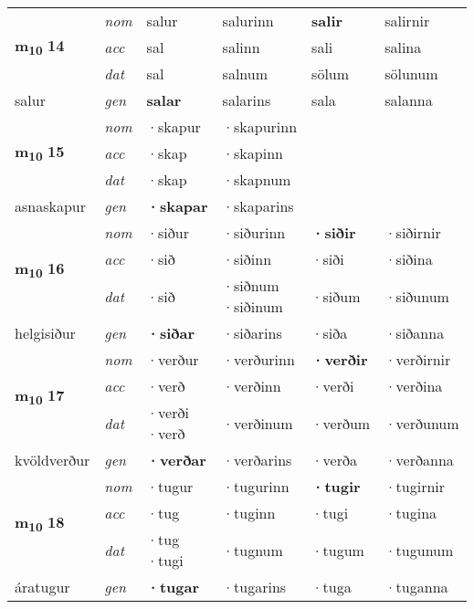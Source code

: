 \begin{longtable}[l]{X>{\footnotesize\itshape}XXXXX}
\multirow{3}{*}{{{\textbf{m{\textsubscript{10}}} \Large{\textbf{14}}}}}  
 & nom & salur & salurinn    & \textbf{salir} & salirnir  \\*
 & acc & sal  & salinn   & sali  & salina \\*
 & dat & sal & salnum   & sölum & sölunum \\*
 {\footnotesize{salur}} &  gen & \textbf{salar}  & salarins  & sala & salanna \\
\cmidrule{1-6}


\multirow{3}{*}{{{\textbf{m{\textsubscript{10}}} \Large{\textbf{15}}}}}  
 & nom & ·skapur & ·skapurinn    & \textbf{} &   \\*
 & acc & ·skap  & ·skapinn   &   &  \\*
 & dat & ·skap & ·skapnum   &  &  \\*
 {\footnotesize{asnaskapur}} &  gen & \textbf{·skapar}  & ·skaparins  &  &  \\
\cmidrule{1-6}


\multirow{3}{*}{{{\textbf{m{\textsubscript{10}}} \Large{\textbf{16}}}}}  
 & nom & ·siður & ·siðurinn    & \textbf{·siðir} & ·siðirnir  \\*
 & acc & ·sið  & ·siðinn   & ·siði  & ·siðina \\*
 & dat & ·sið & \specialcell{·siðnum\\  ·siðinum}   & ·siðum & ·siðunum \\*
 {\footnotesize{helgisiður}} &  gen & \textbf{·siðar}  & ·siðarins  & ·siða & ·siðanna \\
\cmidrule{1-6}


\multirow{3}{*}{{{\textbf{m{\textsubscript{10}}} \Large{\textbf{17}}}}}  
 & nom & ·verður & ·verðurinn    & \textbf{·verðir} & ·verðirnir  \\*
 & acc & ·verð  & ·verðinn   & ·verði  & ·verðina \\*
 & dat & \specialcell{·verði\\  ·verð} & ·verðinum   & ·verðum & ·verðunum \\*
 {\footnotesize{kvöldverður}} &  gen & \textbf{·verðar}  & ·verðarins  & ·verða & ·verðanna \\
\cmidrule{1-6}


\multirow{3}{*}{{{\textbf{m{\textsubscript{10}}} \Large{\textbf{18}}}}}  
 & nom & ·tugur & ·tugurinn    & \textbf{·tugir} & ·tugirnir  \\*
 & acc & ·tug  & ·tuginn   & ·tugi  & ·tugina \\*
 & dat & \specialcell{·tug\\  ·tugi} & ·tugnum   & ·tugum & ·tugunum \\*
 {\footnotesize{áratugur}} &  gen & \textbf{·tugar}  & ·tugarins  & ·tuga & ·tuganna \\
\cmidrule{1-6}



\end{longtable}
